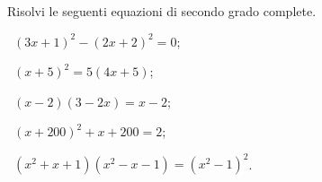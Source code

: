 %

\begin{esercizio}[\Ast]
 \label{ese:3.12}
Risolvi le seguenti equazioni di secondo grado complete.
\begin{multicols}{2}
 \begin{enumeratea}
 \item~$(3 x + 1)^{2}-(2 x + 2)^{2} = 0$;
 \item~$(x + 5)^{2} = 5 (4 x + 5)$;
 \item~$(x-2) (3-2 x) = x-2$;
 \item~$(x + 200)^{2} + x + 200 = 2$;
 \item~$(x^{2} + x + 1) (x^{2}-x-1) = (x^{2}-1)^{2}$.
 \end{enumeratea}
 \end{multicols}
\end{esercizio}

